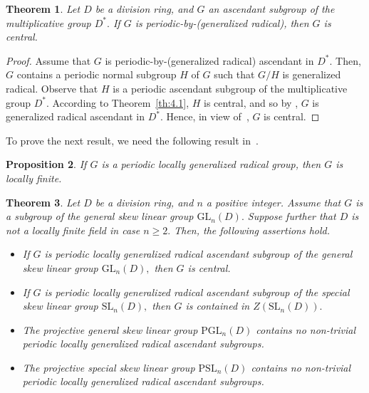 \documentclass{amsart}
\newtheorem{theorem}{Theorem}[section]
\newtheorem{proposition}[theorem]{Proposition}
\theoremstyle{definition}
\begin{document}
\begin{theorem}\label{th:4.7} Let $D$ be a division ring, and $G$  an ascendant subgroup of the multiplicative group $D^*.$ If $G$ is periodic-by-(generalized radical), then $G$ is central.
\end{theorem}
\begin{proof} Assume that $G$ is periodic-by-(generalized radical) ascendant in $D^*.$ Then, $G$ contains a periodic normal subgroup $H$ of $G$ such that $G/H$ is generalized radical. Observe that $H$ is a periodic ascendant subgroup of the multiplicative group $D^*.$ According to Theorem~\ref{th:4.1}, $H$ is central, and so by \cite[Lemma 2.1]{Pa_ChuaHai_2026}, $G$ is generalized radical ascendant in $D^*$. Hence, in view of~\cite[Theorem 3.8]{Pa_ChuaHai_2026}, $G$ is central.
\end{proof}
To prove the next result, we need the following result in~\cite[Lemma 1.2.17]{Bo_Dixon_2017}.
\begin{proposition}\label{pro:4.8}{\rm \cite[Lemma 1.2.17]{Bo_Dixon_2017}} If $G$ is a periodic locally generalized radical group, then $G$ is locally finite.
\end{proposition}
\begin{theorem}\label{th:4.9} Let $D$ be a division ring, and $n$ a positive integer. Assume that $G$ is a subgroup of the general skew linear group $\mathrm{GL}_n(D).$ Suppose further that  $D$ is not a locally finite field in case $n\geq 2.$ Then, the following assertions hold.
	\begin{itemize}
		\item [(1)]  If $G$ is periodic locally generalized radical ascendant subgroup of the general skew linear group $\mathrm{GL}_n(D),$ then $G$ is central.
		\item [(2)] If $G$ is periodic locally generalized radical ascendant subgroup of the special skew linear group $\mathrm{SL}_n(D),$ then $G$ is contained in $Z(\mathrm{SL}_n(D)).$
		\item [(3)] The projective general skew linear group $\mathrm{PGL}_n(D)$ contains no non-trivial periodic locally generalized radical ascendant subgroups.
		\item [(4)] The  projective special skew linear group $\mathrm{PSL}_n(D)$ contains no non-trivial periodic locally generalized radical ascendant subgroups.
	\end{itemize}
\end{theorem}
\end{document}
